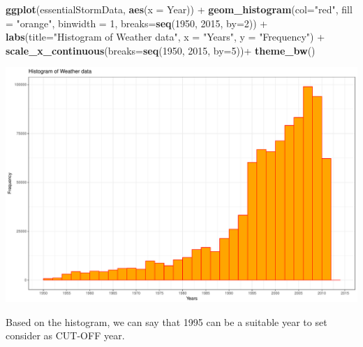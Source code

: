 \documentclass[]{article}
\newenvironment{Shaded}{\begin{snugshade}}{\end{snugshade}}
\newcommand{\KeywordTok}[1]{\textcolor[rgb]{0.13,0.29,0.53}{\textbf{{#1}}}}
\newcommand{\DataTypeTok}[1]{\textcolor[rgb]{0.13,0.29,0.53}{{#1}}}
\newcommand{\DecValTok}[1]{\textcolor[rgb]{0.00,0.00,0.81}{{#1}}}
\newcommand{\StringTok}[1]{\textcolor[rgb]{0.31,0.60,0.02}{{#1}}}
\newcommand{\NormalTok}[1]{{#1}}
\begin{document}
\begin{Shaded}
\begin{Highlighting}[]
\KeywordTok{ggplot}\NormalTok{(essentialStormData, }\KeywordTok{aes}\NormalTok{(}\DataTypeTok{x =} \NormalTok{Year)) +}\StringTok{ }
\StringTok{     }\KeywordTok{geom_histogram}\NormalTok{(}\DataTypeTok{col=}\StringTok{"red"}\NormalTok{, }
                    \DataTypeTok{fill =} \StringTok{"orange"}\NormalTok{, }
                    \DataTypeTok{binwidth =} \DecValTok{1}\NormalTok{,}
                    \DataTypeTok{breaks=}\KeywordTok{seq}\NormalTok{(}\DecValTok{1950}\NormalTok{, }\DecValTok{2015}\NormalTok{, }\DataTypeTok{by=}\DecValTok{2}\NormalTok{)) +}\StringTok{ }
\StringTok{     }\KeywordTok{labs}\NormalTok{(}\DataTypeTok{title=}\StringTok{"Histogram of Weather data"}\NormalTok{, }
          \DataTypeTok{x =} \StringTok{"Years"}\NormalTok{, }
          \DataTypeTok{y =} \StringTok{"Frequency"}\NormalTok{) +}\StringTok{ }
\StringTok{     }\KeywordTok{scale_x_continuous}\NormalTok{(}\DataTypeTok{breaks=}\KeywordTok{seq}\NormalTok{(}\DecValTok{1950}\NormalTok{, }\DecValTok{2015}\NormalTok{, }\DataTypeTok{by=}\DecValTok{5}\NormalTok{))+}
\StringTok{     }\KeywordTok{theme_bw}\NormalTok{() }
\end{Highlighting}
\end{Shaded}

\includegraphics{NOAAStormDataAnalysis_files/figure-latex/unnamed-chunk-7-1.pdf}

Based on the histogram, we can say that 1995 can be a suitable year to
set consider as CUT-OFF year.

\begin{Shaded}
\end{Shaded}
\end{document}
